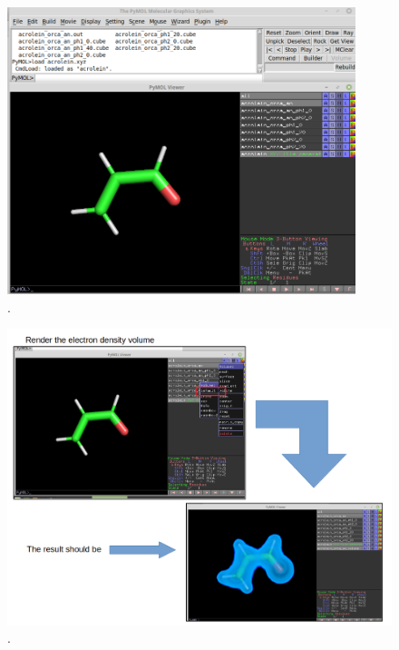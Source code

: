 \documentclass[a4paper,11pt]{refart}
\begin{document}
\hspace*{-\leftmarginwidth}
\begin{minipage}{\fullwidth}
	\begin{figure}[H]
		\begin{center}
			\includegraphics[width=4in]{images/T4_img1}
			\caption{.}
			\label{T4_img1}
		\end{center}
	\end{figure}
\end{minipage}

\hspace*{-\leftmarginwidth}
\begin{minipage}{\fullwidth}
	\begin{figure}[H]
		\begin{center}
			\includegraphics[width=6in]{images/T4_img2}
			\caption{.}
			\label{T4_img2}
		\end{center}
	\end{figure}
\end{minipage}
\end{document}
